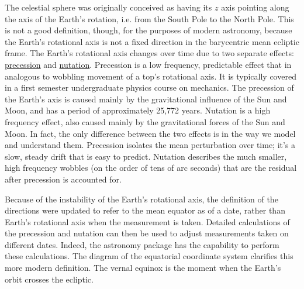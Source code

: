 The celestial sphere was originally conceived as having its $z$ axis pointing along the axis of the Earth's rotation, i.e. from the South Pole to the North Pole.
This is not a good definition, though, for the purposes of modern astronomy, 
because the Earth's rotational axis is not a fixed direction in the barycentric mean ecliptic frame.
The Earth's rotational axis changes over time due to two separate effects: 
\href{https://en.wikipedia.org/wiki/Axial_precession}{precession} and \href{https://en.wikipedia.org/wiki/Astronomical_nutation}{nutation}.
Precession is a low frequency, predictable effect that in analogous to wobbling movement of a top's rotational axis.
It is typically covered in a first semester undergraduate physics course on mechanics.
The precession of the Earth's axis is caused mainly by the gravitational influence of the Sun and Moon, and has a period of approximately 25,772 years.
Nutation is a high frequency effect, also caused mainly by the gravitational forces of the Sun and Moon.
In fact, the only difference between the two effects is in the way we model and understand them.
Precession isolates the mean perturbation over time; it's a slow, steady drift that is easy to predict.
Nutation describes the much smaller, high frequency wobbles (on the order of tens of arc seconds) that are the residual after precession is accounted for.

Because of the instability of the Earth's rotational axis, the definition of the directions were updated to refer to the mean equator as of a date,
rather than Earth's rotational axis when the measurement is taken.
Detailed calculations of the precession and nutation can then be used to adjust measurements taken on different dates.
Indeed, the  astronomy package has the capability to perform these calculations.
The diagram of the equatorial coordinate system clarifies this more modern definition.  
The vernal equinox is the moment when the Earth's orbit crosses the ecliptic.

